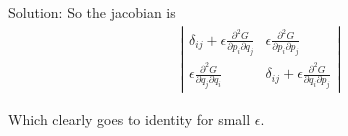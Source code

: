 \begin{homeworkProblem}
\begin{callout}{Solution:}
    So the jacobian is
    \begin{align*}
        \left|\begin{matrix}
            \delta_{ij} + \epsilon \frac{\partial^{2}G}{\partial p_i \partial q_j} &
            \epsilon \frac{\partial^{2}G}{\partial p_i \partial p_j} \\
            \epsilon \frac{\partial^{2}G}{\partial q_j \partial q_i} &
            \delta_{ij} + \epsilon \frac{\partial^{2}G}{\partial q_i \partial p_j}
        \end{matrix}\right|
    \end{align*}

    Which clearly goes to identity for small $\epsilon$.

    \end{callout}

\end{homeworkProblem}

